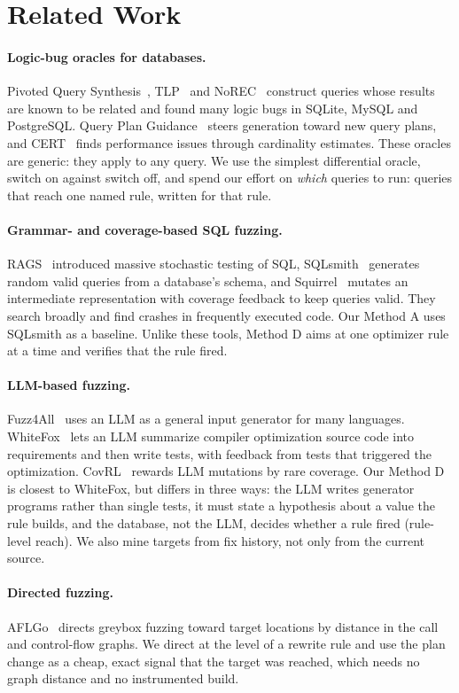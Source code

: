 \section{Related Work}
\label{sec:related}

\paragraph{Logic-bug oracles for databases.} Pivoted Query Synthesis~\cite{rigger2020pqs}, TLP~\cite{rigger2020tlp} and
NoREC~\cite{rigger2020norec} construct queries whose results are known to be related and found many logic bugs in
SQLite, MySQL and PostgreSQL. Query Plan Guidance~\cite{ba2023qpg} steers generation toward new query plans, and
CERT~\cite{ba2024cert} finds performance issues through cardinality estimates. These oracles are generic: they apply to
any query. We use the simplest differential oracle, switch on against switch off, and spend our effort on
\emph{which} queries to run: queries that reach one named rule, written for that rule.

\paragraph{Grammar- and coverage-based SQL fuzzing.} RAGS~\cite{slutz1998rags} introduced massive stochastic testing
of SQL, SQLsmith~\cite{sqlsmith} generates random valid queries from a database's schema, and
Squirrel~\cite{zhong2020squirrel} mutates an intermediate representation with coverage feedback to keep queries valid.
They search broadly and find crashes in frequently executed code. Our Method A uses SQLsmith as a baseline. Unlike
these tools, Method D aims at one optimizer rule at a time and verifies that the rule fired.

\paragraph{LLM-based fuzzing.} Fuzz4All~\cite{xia2024fuzz4all} uses an LLM as a general input generator for many
languages. WhiteFox~\cite{yang2024whitefox} lets an LLM summarize compiler optimization source code into requirements
and then write tests, with feedback from tests that triggered the optimization. CovRL~\cite{eom2024covrl} rewards LLM
mutations by rare coverage. Our Method D is closest to WhiteFox, but differs in three ways: the LLM writes generator
programs rather than single tests, it must state a hypothesis about a value the rule builds, and the database, not the
LLM, decides whether a rule fired (rule-level reach). We also mine targets from fix history, not only from the current
source.

\paragraph{Directed fuzzing.} AFLGo~\cite{bohme2017aflgo} directs greybox fuzzing toward target locations by distance
in the call and control-flow graphs. We direct at the level of a rewrite rule and use the plan change as a cheap,
exact signal that the target was reached, which needs no graph distance and no instrumented build.

